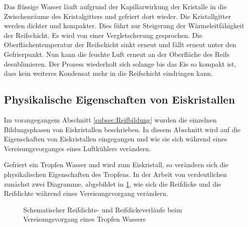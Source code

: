 Das flüssige Wasser läuft aufgrund der Kapillarwirkung der Kristalle in die Zwischenräume des Kristalgitters und gefriert dort wieder. Die Kristallgitter werden dichter und kompakter. Dies führt zur Steigerung der Wärmeleitfähigkeit der Reifschicht. Es wird von einer Vergletscherung gesprochen. Die Oberflächentemperatur der Reifschicht sinkt erneut und fällt erneut unter den Gefrierpunkt. Nun kann die feuchte Luft erneut an der Oberfläche des Reifs desublimieren. Der Prozess wiederholt sich solange bis das Eis so kompakt ist, dass kein weiteres Kondensat mehr in die Reifschicht eindringen kann. 

\subsection*{Physikalische Eigenschaften von Eiskristallen}

 Im vorangegangem Abschnitt \ref{subsec:Reifbildung} wurden die einzelnen Bildungsphasen von Eiskristallen beschrieben. In diesem Abschnitt wird auf die Eigenschaften von Eiskristallen eingegangen und wie sie sich während eines Vereisungsvorganges eines Luftkühlers verändern. 
 
Gefriert ein Tropfen Wasser und wird zum Eiskristall, so verändern sich die physikalischen Eigenschaften des Tropfens. In der Arbeit von \textsc{\citeauthor{Schydlo2010}} verdeutlichen zunächst zwei Diagramme, abgebildet in \ref{fig:Zeiverlaufe von Reifdichte und -dicke}, wie sich die Reifdicke und die Reifdichte während eines Vereisungsvorgang verändern. 

\begin{figure}
\centering
\caption{Schematischer Reifdichte- und Reifdickeverläufe beim Vereisungsvorgang eines Tropfen Wassers \citep{Schydlo2010}}
\label{fig:Zeiverlaufe von Reifdichte und -dicke}
\end{figure}

